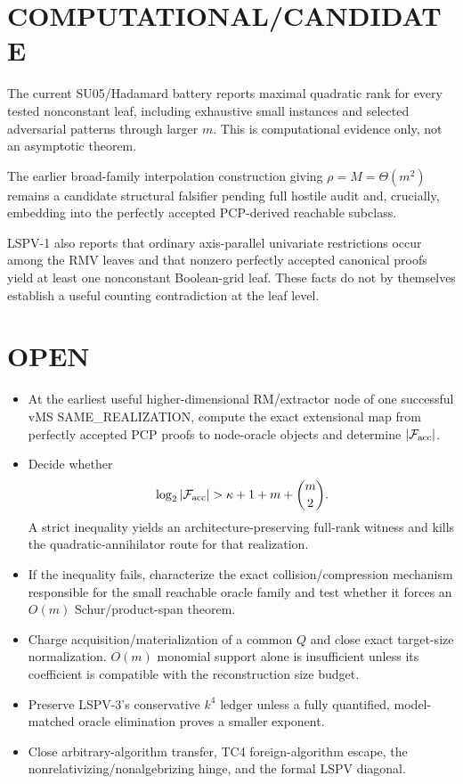 \documentclass[11pt]{article}
\begin{document}
\section*{COMPUTATIONAL/CANDIDATE}
The current SU05/Hadamard battery reports maximal quadratic rank for every tested nonconstant leaf, including exhaustive small instances and selected adversarial patterns through larger $m$. This is computational evidence only, not an asymptotic theorem.

The earlier broad-family interpolation construction giving $\rho=M=\Theta(m^2)$ remains a candidate structural falsifier pending full hostile audit and, crucially, embedding into the perfectly accepted PCP-derived reachable subclass.

LSPV-1 also reports that ordinary axis-parallel univariate restrictions occur among the RMV leaves and that nonzero perfectly accepted canonical proofs yield at least one nonconstant Boolean-grid leaf. These facts do not by themselves establish a useful counting contradiction at the leaf level.

\section*{OPEN}
\begin{itemize}
\item At the earliest useful higher-dimensional RM/extractor node of one successful vMS SAME_REALIZATION, compute the exact extensional map from perfectly accepted PCP proofs to node-oracle objects and determine $|\mathcal F_{\rm acc}|$.
\item Decide whether
\[
\log_2|\mathcal F_{\rm acc}|>\kappa+1+m+\binom m2.
\]
A strict inequality yields an architecture-preserving full-rank witness and kills the quadratic-annihilator route for that realization.
\item If the inequality fails, characterize the exact collision/compression mechanism responsible for the small reachable oracle family and test whether it forces an $O(m)$ Schur/product-span theorem.
\item Charge acquisition/materialization of a common $Q$ and close exact target-size normalization. $O(m)$ monomial support alone is insufficient unless its coefficient is compatible with the reconstruction size budget.
\item Preserve LSPV-3's conservative $k^4$ ledger unless a fully quantified, model-matched oracle elimination proves a smaller exponent.
\item Close arbitrary-algorithm transfer, TC4 foreign-algorithm escape, the nonrelativizing/nonalgebrizing hinge, and the formal LSPV diagonal.
\end{itemize}
\end{document}
